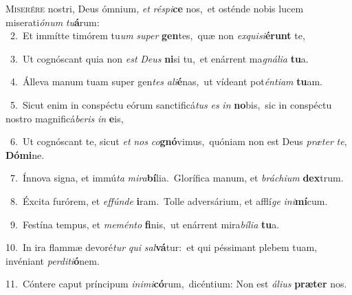 \lettrine{\initial\textcolor{\initialcolor}{M}}{iserére} nostri, Deus ómnium, \textit{et} \textit{ré}\-\textit{spi}\textbf{ce} nos,~\star et osténde nobis lucem miserati\-\textit{ó}\-\textit{num} \textit{tu}\-\textbf{á}rum:\\
{\numbfont\textcolor{\numbcolor}{~2.}}~Et immítte timórem tu\textit{um} \textit{su}\-\textit{per} \textbf{gen}\-tes,~\star quæ non \textit{ex}\-\textit{qui}\textit{si}\textbf{é}\textbf{runt} te,\par
{\numbfont\textcolor{\numbcolor}{~3.}}~Ut cognóscant quia non \textit{est} \textit{De}\-\textit{us} \textbf{ni}\-si tu,~\star et enárrent ma\-\textit{gná}\-\textit{li}\textit{a} \textbf{tu}\-a.\par
{\numbfont\textcolor{\numbcolor}{~4.}}~Álleva manum tuam super gen\textit{tes} \textit{a}\-\textit{li}\textbf{é}nas,~\star ut vídeant pot\-\textit{én}\-\textit{ti}\textit{am} \textbf{tu}\-am.\par
{\numbfont\textcolor{\numbcolor}{~5.}}~Sicut enim in conspéctu eórum sanctificá\textit{tus} \textit{es} \textit{in} \textbf{no}\-bis,~\star sic in conspéctu nostro magnificá\-\textit{be}\-\textit{ris} \textit{in} \textbf{e}\-is,\par
{\numbfont\textcolor{\numbcolor}{~6.}}~Ut cognóscant te, sicut \textit{et} \textit{nos} \textit{co}\-\textbf{gnó}vimus,~\star quóniam non est Deus \textit{præ}\-\textit{ter} \textit{te}\-, \textbf{Dó}\-\textbf{mi}ne.\par
{\numbfont\textcolor{\numbcolor}{~7.}}~Ínnova signa, et immú\textit{ta} \textit{mi}\-\textit{ra}\textbf{bí}lia.~\star Glorífica manum, et \textit{brá}\-\textit{chi}\textit{um} \textbf{dex}\-trum.\par
{\numbfont\textcolor{\numbcolor}{~8.}}~Éxcita furórem, et \textit{ef}\-\textit{fún}\textit{de} \textbf{i}\-ram.~\star Tolle adversárium, et afflí\textit{ge} \textit{in}\-\textit{i}\textbf{mí}cum.\par
{\numbfont\textcolor{\numbcolor}{~9.}}~Festína tempus, et \textit{me}\-\textit{mén}\textit{to} \textbf{fi}\-nis,~\star ut enárrent mira\-\textit{bí}\-\textit{li}\textit{a} \textbf{tu}\-a.\par
{\numbfont\textcolor{\numbcolor}{10.}}~In ira flammæ devoré\textit{tur} \textit{qui} \textit{sal}\-\textbf{vá}tur:~\star et qui péssimant plebem tuam, invéniant \textit{per}\-\textit{di}\textit{ti}\textbf{ó}nem.\par
{\numbfont\textcolor{\numbcolor}{11.}}~Cóntere caput príncipum \textit{in}\-\textit{i}\textit{mi}\textbf{có}rum,~\star dicéntium: Non est \textit{á}\-\textit{li}\textit{us} \textbf{præ}\-\textbf{ter} nos.\par
